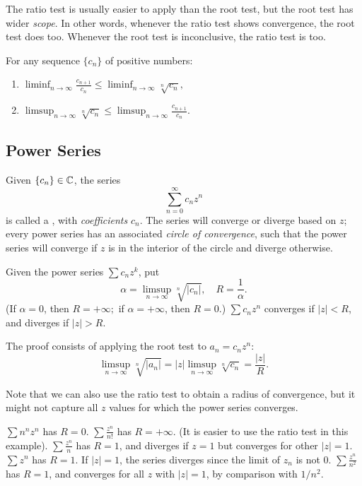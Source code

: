 \documentclass{article}
\begin{document}
\begin{remark}
    The ratio test is usually easier to apply than the root test, but the root test has wider \textit{scope}. In other words, whenever the ratio test shows convergence, the root test does too. Whenever the root test is inconclusive, the ratio test is too.
\end{remark}
\begin{theorem}
    For any sequence $\{c_{n}\}$ of positive numbers:
    \begin{enumerate}
        \item $\liminf_{n\rightarrow\infty}\frac{c_{n+1}}{c_{n}}\leq \liminf_{n\rightarrow\infty}\sqrt[n]{c_{n}},$
        \item $\limsup_{n\rightarrow\infty}\sqrt[n]{c_{n}}\leq \limsup_{n\rightarrow\infty}\frac{c_{n+1}}{c_{n}}.$
    \end{enumerate}
\end{theorem}

\subsection{Power Series}
\begin{definition}
    Given $\{c_{n}\}\in\mathbb C$, the series \[\sum_{n=0}^{\infty}c_{n}z^{n}\]is called a , with \textit{coefficients} $c_{n}$. The series will converge or diverge based on $z$; every power series has an associated \textit{circle of convergence}, such that the power series will converge if $z$ is in the interior of the circle and diverge otherwise.
\end{definition}
\begin{theorem}
    Given the power series $\sum c_{n}z^{k}$, put \[\alpha=\limsup_{n\rightarrow\infty}\sqrt[n]{|c_{n}|},\quad R=\frac{1}{\alpha}.\](If $\alpha=0$, then $R=+\infty;$ if $\alpha=+\infty$, then $R=0$.) $\sum c_{n}z^{n}$ converges if $|z|<R$, and diverges if $|z|>R$. 
    
\end{theorem}
\begin{remark}
    The proof consists of applying the root test to $a_{n}=c_{n}z^{n}$:
    \[\limsup_{n\rightarrow\infty}\sqrt[n]{|a_{n}|}=|z|\limsup_{n\rightarrow\infty}\sqrt[n]{c_{n}}=\frac{|z|}{R}.\]

    Note that we can also use the ratio test to obtain a radius of convergence, but it might not capture all $z$ values for which the power series converges.
\end{remark}
\begin{example}
    \listhack 
    \begin{enumerate}
        \ii $\sum n^{n}z^{n}$ has $R=0$.
        \ii $\sum\frac{z^{n}}{n!}$ has $R=+\infty$. (It is easier to use the ratio test in this example).
        \ii $\sum \frac{z^{n}}{n}$ has $R=1$, and diverges if $z=1$ but converges for other $|z|=1$.
        \ii $\sum z^{n}$ has $R=1$. If $|z|=1$, the series diverges since the limit of $z_{n}$ is not 0.
        \ii $\sum\frac{z^{n}}{n^{2}}$ has $R=1$, and converges for all $z$ with $|z|=1$, by comparison with $1/n^{2}$.
    \end{enumerate}
\end{example}
\end{document}
